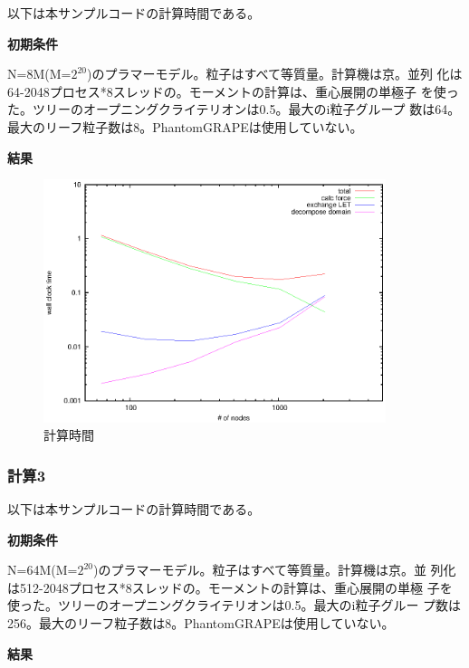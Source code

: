 以下は本サンプルコードの計算時間である。

{\bf 初期条件}

N=8M(M=$2^{20}$)のプラマーモデル。粒子はすべて等質量。計算機は京。並列
化は64-2048プロセス*8スレッドの。モーメントの計算は、重心展開の単極子
を使った。ツリーのオープニングクライテリオンは0.5。最大のi粒子グループ
数は64。最大のリーフ粒子数は8。PhantomGRAPEは使用していない。

{\bf 結果}

\begin{figure}
  \begin{center}
\includegraphics[width=10cm]{fig/nbody_mono_noPHG_tcal.eps}
  \end{center}
  \caption{計算時間}
  \label{fig:nbody_mono_noPHG_tcal}
\end{figure}

\subsubsection{計算3}

以下は本サンプルコードの計算時間である。

{\bf 初期条件}

N=64M(M=$2^{20}$)のプラマーモデル。粒子はすべて等質量。計算機は京。並
列化は512-2048プロセス*8スレッドの。モーメントの計算は、重心展開の単極
子を使った。ツリーのオープニングクライテリオンは0.5。最大のi粒子グルー
プ数は256。最大のリーフ粒子数は8。PhantomGRAPEは使用していない。

{\bf 結果}

